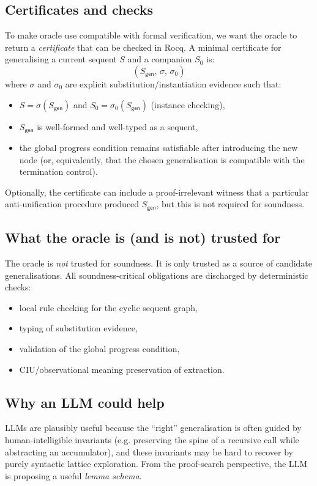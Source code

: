 \subsection{Certificates and checks}
To make oracle use compatible with formal verification, we want the oracle to return a \emph{certificate} that can be checked in Rocq.
A minimal certificate for generalising a current sequent \(S\) and a companion \(S_0\) is:
\[
  (S_{\mathsf{gen}},\,\sigma,\,\sigma_0)
\]
where \(\sigma\) and \(\sigma_0\) are explicit substitution/instantiation evidence such that:
\begin{itemize}[leftmargin=*]
\item \(S = \sigma(S_{\mathsf{gen}})\) and \(S_0 = \sigma_0(S_{\mathsf{gen}})\) (instance checking),
\item \(S_{\mathsf{gen}}\) is well-formed and well-typed as a sequent,
\item the global progress condition remains satisfiable after introducing the new node (or, equivalently, that the chosen generalisation is compatible with the termination control).
\end{itemize}
Optionally, the certificate can include a proof-irrelevant witness that a particular anti-unification procedure produced \(S_{\mathsf{gen}}\), but this is not required for soundness.

\subsection{What the oracle is (and is not) trusted for}
The oracle is \emph{not} trusted for soundness.
It is only trusted as a source of candidate generalisations.
All soundness-critical obligations are discharged by deterministic checks:
\begin{itemize}[leftmargin=*]
\item local rule checking for the cyclic sequent graph,
\item typing of substitution evidence,
\item validation of the global progress condition,
\item CIU/observational meaning preservation of extraction.
\end{itemize}

\subsection{Why an LLM could help}
LLMs are plausibly useful because the ``right'' generalisation is often guided by human-intelligible invariants (e.g. preserving the spine of a recursive call while abstracting an accumulator), and these invariants may be hard to recover by purely syntactic lattice exploration.
From the proof-search perspective, the LLM is proposing a useful \emph{lemma schema}.

